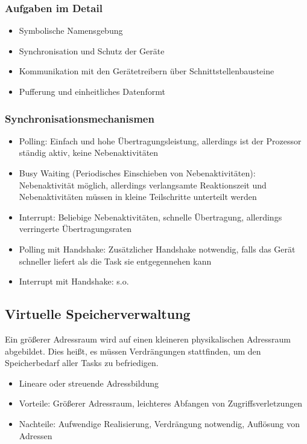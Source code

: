 \subsubsection{Aufgaben im Detail}
\begin{itemize}
	\item Symbolische Namensgebung
	\item Synchronisation und Schutz der Geräte
	\item Kommunikation mit den Gerätetreibern über Schnittstellenbausteine
	\item Pufferung und einheitliches Datenformt
\end{itemize}

\subsubsection{Synchronisationsmechanismen}
\begin{itemize}
	\item Polling: Einfach und hohe Übertragungsleistung, allerdings ist der Prozessor ständig aktiv, keine Nebenaktivitäten
	\item Busy Waiting (Periodisches Einschieben von Nebenaktivitäten): Nebenaktivität möglich, allerdings verlangsamte Reaktionszeit und Nebenaktivitäten müssen in kleine Teilschritte unterteilt werden
	\item Interrupt: Beliebige Nebenaktivitäten, schnelle Übertragung, allerdings verringerte Übertragungsraten
	\item Polling mit Handshake: Zusätzlicher Handshake notwendig, falls das Gerät schneller liefert als die Task sie entgegennehen kann
	\item Interrupt mit Handshake: s.o.
\end{itemize}


\subsection{Virtuelle Speicherverwaltung}
Ein größerer Adressraum wird auf einen kleineren physikalischen Adressraum abgebildet. Dies heißt, es müssen Verdrängungen stattfinden, um den Speicherbedarf aller Tasks zu befriedigen.

\begin{itemize}
	\item Lineare oder streuende Adressbildung
	\item Vorteile: Größerer Adressraum, leichteres Abfangen von Zugriffsverletzungen
	\item Nachteile: Aufwendige Realisierung, Verdrängung notwendig, Auflösung von Adressen
\end{itemize}


